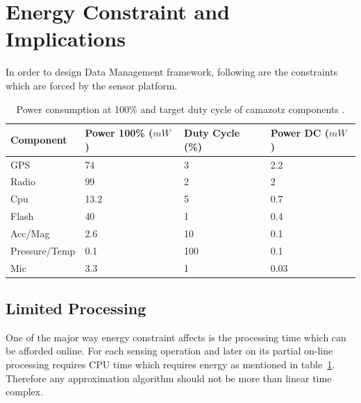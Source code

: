 \documentclass[conference]{IEEEtran}
\begin{document}
\section{Energy Constraint and Implications}\label{sec:constraints}
In order to design Data Management framework, following are the constraints which are forced by the sensor 
platform.
%
%
\begin{table}[h]
\caption{Power consumption at 100\% and target duty cycle of camazotz components \cite{raja-ipsn}.}
\label{tab:power-consumption}
    \begin{center}
    \begin{tabular}{   l  l  l  l }
    \hline
    Component & Power 100\% ($mW$) & Duty Cycle (\%) & Power DC ($mW$)\\ \hline
    GPS & 74 & 3 & 2.2 \\ \hline
    Radio & 99 & 2 & 2 \\ \hline
    Cpu & 13.2 & 5 & 0.7 \\ \hline    
    Flash & 40 & 1 & 0.4 \\ \hline    
    Acc/Mag & 2.6 & 10 & 0.1 \\ \hline
    Pressure/Temp & 0.1 & 100 & 0.1 \\ \hline
    Mic & 3.3 & 1 & 0.03 \\ \hline
    \end{tabular}
    \end{center}
\end{table}
\subsection{Limited Processing}
One of the major way energy constraint affects is the processing time which can be afforded online. For each 
sensing operation and later on its partial on-line processing requires CPU time which requires energy as 
mentioned in table~\ref{tab:power-consumption}. Therefore any approximation algorithm should not be more 
than linear time complex.
\end{document}
